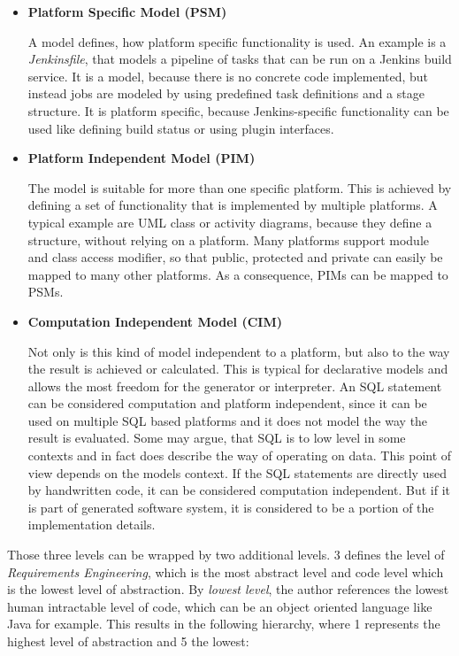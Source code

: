 \begin{itemize}
	
	\item \textbf{Platform Specific Model (\ac{PSM})}
	
	A model defines, how platform specific functionality is used.
	An example is a \textit{Jenkinsfile}, that models a pipeline of tasks that can be run on a Jenkins build service.
	It is a model, because there is no concrete code implemented, but instead jobs are modeled by using predefined task definitions and a stage structure.
	It is platform specific, because Jenkins-specific functionality can be used like defining build status or using plugin interfaces.
	
	\item \textbf{Platform Independent Model (\ac{PIM})}
	
	The model is suitable for more than one specific platform.
	This is achieved by defining a set of functionality that is implemented by multiple platforms.
	A typical example are \ac{UML} class or activity diagrams, because they define a structure, without relying on a platform.
	Many platforms support module and class access modifier, so that public, protected and private can easily be mapped to many other platforms.
	As a consequence, \acp{PIM} can be mapped to \acp{PSM}.
	
	\item \textbf{Computation Independent Model (\ac{CIM})}
	
	Not only is this kind of model independent to a platform, but also to the way the result is achieved or calculated.
	This is typical for declarative models and allows the most freedom for the generator or interpreter.
	An \ac{SQL} statement can be considered computation and platform independent, since it can be used on multiple \ac{SQL} based platforms and it does not model the way the result is evaluated.
	Some may argue, that \ac{SQL} is to low level in some contexts and in fact does describe the way of operating on data.
	This point of view depends on the models context.
	If the \ac{SQL} statements are directly used by handwritten code, it can be considered computation independent.
	But if it is part of generated software system, it is considered to be a portion of the implementation details.
	
\end{itemize}

Those three levels can be wrapped by two additional levels.
\cite{jeary_embedding_2011} 3 defines the level of \textit{Requirements Engineering}, which is the most abstract level and code level which is the lowest level of abstraction.
By \textit{lowest level}, the author references the lowest human intractable level of code, which can be an object oriented language like Java for example.
This results in the following hierarchy, where 1 represents the highest level of abstraction and 5 the lowest:

